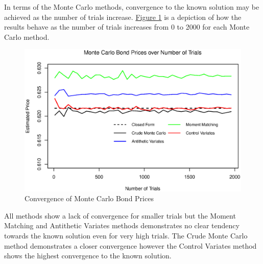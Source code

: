 \documentclass[12pt,a4paper]{article}
\begin{document}
In terms of the Monte Carlo methods, convergence to the known solution may be achieved as the number of trials increase. \hyperref[fig:MC Conv]{Figure 1} is a depiction of how the results behave as the number of trials increases from 0 to 2000 for each Monte Carlo method. 
\begin{figure}[H]	
	\label{fig:MC Conv}
	\begin{center}
		\includegraphics[trim={0 0.5cm 0 0},clip, width = 14cm]{MC_Conv.eps}
		\caption{Convergence of Monte Carlo Bond Prices}
	\end{center}
\end{figure}

All methods show a lack of convergence for smaller trials but the Moment Matching and Antithetic Variates methods demonstrates no clear tendency towards the known solution even for very high trials. The Crude Monte Carlo method demonstrates a closer convergence however the Control Variates method shows the highest convergence to the known solution.
\end{document}
